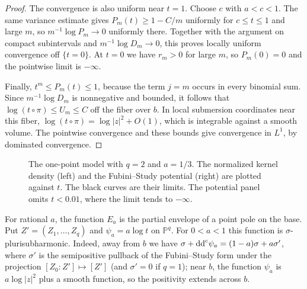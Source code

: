 \begin{proof}
The convergence is also uniform near $t=1$. Choose $c$ with $a<c<1$. The same variance estimate gives $P_m(t)\geq1-C/m$ uniformly for $c\leq t\leq1$ and large $m$, so $m^{-1}\log P_m\to0$ uniformly there. Together with the argument on compact subintervals and $m^{-1}\log D_m\to0$, this proves locally uniform convergence off $\{t=0\}$. At $t=0$ we have $r_m>0$ for large $m$, so $P_m(0)=0$ and the pointwise limit is $-\infty$.

Finally, $t^m\leq P_m(t)\leq1$, because the term $j=m$ occurs in every binomial sum. Since $m^{-1}\log D_m$ is nonnegative and bounded, it follows that $\log(t\circ\pi)\leq U_m\leq C$ off the fiber over $b$. In local submersion coordinates near this fiber, $\log(t\circ\pi)=\log|z|^2+O(1)$, which is integrable against a smooth volume. The pointwise convergence and these bounds give convergence in $L^1$, by dominated convergence.
\end{proof}

\begin{figure}[htbp]
\centering
\resizebox{0.96\textwidth}{!}{}
\caption{The one-point model with $q=2$ and $a=1/3$. The normalized kernel density (left) and the Fubini--Study potential (right) are plotted against $t$. The black curves are their limits. The potential panel omits $t<0.01$, where the limit tends to $-\infty$.}
\label{fig:hopf-point-kernel-limit}
\end{figure}

For rational $a$, the function $E_a$ is the partial envelope of a point pole on the base. Put $Z'=(Z_1,\ldots,Z_q)$ and $\psi_a=a\log t$ on $\mathbb P^q$. For $0<a<1$ this function is $\sigma$-plurisubharmonic. Indeed, away from $b$ we have $\sigma+\mathrm{dd}^{\mathrm{c}}\psi_a=(1-a)\sigma+a\sigma'$, where $\sigma'$ is the semipositive pullback of the Fubini--Study form under the projection $[Z_0:Z']\mapsto[Z']$ (and $\sigma'=0$ if $q=1$); near $b$, the function $\psi_a$ is $a\log|z|^2$ plus a smooth function, so the positivity extends across $b$.

